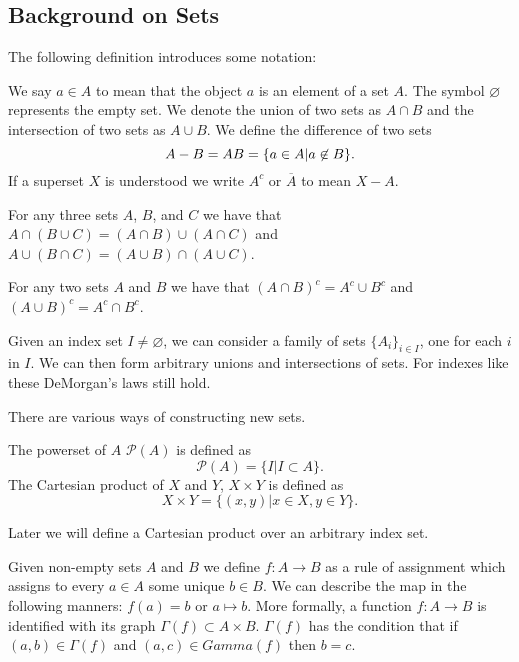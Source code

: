 \subsection{Background on Sets}

The following definition introduces some notation:
\begin{definition}
We say $a \in A$ to mean that the object $a$ is an element of a set $A$. The symbol $\varnothing$ represents the empty set. We denote the union of two sets as $A \cap B$ and the intersection of two sets as $A \cup B$. We define the difference of two sets 
\[A - B = A \\ B = \{a \in A | a \not\in B\}.\]
If a superset $X$ is understood we write $A^c$ or $\overline{A}$ to mean $X - A$.
\end{definition}

\begin{proposition}
For any three sets $A$, $B$, and $C$ we have that $A \cap (B \cup C) = (A \cap B) \cup (A \cap C)$ and $A \cup (B \cap C) = (A \cup B) \cap (A \cup C)$.
\end{proposition}

\begin{proposition}
For any two sets $A$ and $B$ we have that $(A \cap B)^c = A^c \cup B^c$ and $(A \cup B)^c = A^c \cap B^c$. 
\end{proposition}

Given an index set $I \neq \varnothing$, we can consider a family of sets $\{A_i\}_{i \in I}$, one for each $i$ in $I$. We can then form arbitrary unions and intersections of sets. For indexes like these DeMorgan's laws still hold.

There are various ways of constructing new sets.

\begin{definition}
The powerset of $A$ $\mathcal{P}(A)$ is defined as 
\[\mathcal{P}(A) = \{I | I \subset A\}.\]
The Cartesian product of $X$ and $Y$, $X \times Y$ is defined as 
\[X \times Y = \{(x, y) | x \in X, y \in Y\}.\]
\end{definition}

Later we will define a Cartesian product over an arbitrary index set.

Given non-empty sets $A$ and $B$ we define $f:A \to B$ as a rule of assignment which assigns to every $a \in A$ some unique $b \in B$. We can describe the map in the following manners: $f(a) = b$ or $a \mapsto b$. More formally, a function $f: A \to B$ is identified with its graph $\Gamma(f) \subset A \times B$. $\Gamma(f)$ has the condition that if $(a, b) \in \Gamma(f)$ and $(a, c) \in Gamma(f)$ then $b = c$.

